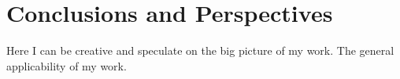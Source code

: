\chapter{Conclusions and Perspectives}
Here I can be creative and speculate on the big picture of my work. The general applicability of my work.
